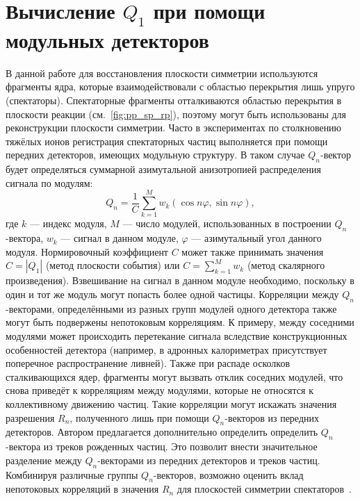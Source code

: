 \section{Вычисление $Q_1$ при помощи модульных детекторов}

В данной работе для восстановления плоскости симметрии используются фрагменты ядра, которые взаимодействовали с областью перекрытия лишь упруго (спектаторы). 
Спектаторные фрагменты отталкиваются областью перекрытия в плоскости реакции (см.~\ref{fig:pp_sp_rp}), поэтому могут быть использованы для реконструкции плоскости симметрии. 
Часто в экспериментах по столкновению тяжёлых ионов регистрация спектаторных частиц выполняется при помощи передних детекторов, имеющих модульную структуру. 
В таком случае $Q_n$-вектор будет определяться суммарной азимутальной анизотропией распределения сигнала по модулям:
%
\begin{equation}
    Q_n  = \frac{1}{C} \sum_{k=1}^M w_k ( \cos n \varphi, \sin n \varphi ),
\end{equation}
%
где $k$ --- индекс модуля, $M$ --- число модулей, использованных в построении $Q_n$-вектора, $w_k$ --- сигнал в данном модуле, $\varphi$ --- азимутальный угол данного модуля. 
Нормировочный коэффициент $C$ может также принимать значения $C=|Q_1|$ (метод плоскости события) или $C=\sum_{k=1}^M w_k$ (метод скалярного произведения).
Взвешивание на сигнал в данном модуле необходимо, поскольку в один и тот же модуль могут попасть более одной частицы.
Корреляции между $Q_n$-векторами, определёнными из разных групп модулей одного детектора также могут быть подвержены непотоковым корреляциям.
К примеру, между соседними модулями может происходить перетекание сигнала вследствие конструкционных особенностей детектора (например, в адронных калориметрах присутствует поперечное распространение ливней).
Также при распаде осколков сталкивающихся ядер, фрагменты могут вызвать отклик соседних модулей, что снова приведёт к корреляциям между модулями, которые не относятся к коллективному движению частиц.
Такие корреляции могут искажать значения разрешения $R_n$, полученного лишь при помощи $Q_n$-векторов из передних детекторов.
Автором предлагается дополнительно определить  определить $Q_n$-вектора из треков рожденных частиц.
Это позволит внести значительное разделение между $Q_n$-векторами из передних детекторов и треков частиц.
Комбинируя различные группы $Q_n$-векторов, возможно оценить вклад непотоковых корреляций в значения $R_n$ для плоскостей симметрии спектаторов~\cite{Mamaev:2023fpr,Mamaev:2023yhz,Mamaev:2024}.

